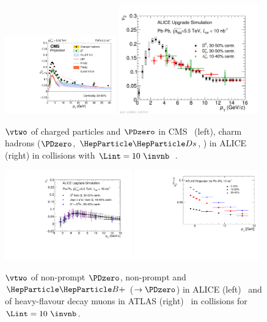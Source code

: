 \begin{figure}[ht]
  \begin{center}
    \includegraphics[width=0.43\textwidth]{hf/figures/cV2_lumiMB_0_wTheory_right.pdf}
   \includegraphics[width=0.54\textwidth]{hf/figures/ALICEUpgrade_charmv2.pdf}
    \caption{$\vtwo$ of charged particles and $\PDzero$ in CMS~\cite{CMS-PAS-FTR-17-002} (left), charm hadrons ($\PDzero$, $\PDs$, \PGLc) in ALICE (right) in \PbPb collisions with $\Lint=10~\invnb$~\cite{Abelev:1625842}.}
    \label{fig:RAAv2.v2charm}
  \end{center}
\end{figure}
\begin{figure}[ht]
  \begin{center}
    \includegraphics[width=0.49\textwidth]{hf/figures/ALICEUpgrade_beautyv2.pdf}
    \includegraphics[width=0.49\textwidth]{hf/figures/hfMuonv2_ATLAS.pdf}
    \caption{$\vtwo$ of non-prompt $\PDzero$, non-prompt \PJGy and $\PBp$ ($\rightarrow \PDzero$) in ALICE (left)~\cite{Abelev:1625842} and of heavy-flavour decay muons in ATLAS (right)~\cite{ATL-PHYS-PUB-2018-020} in \PbPb collisions for $\Lint=10~\invnb$.}
    \label{fig:RAAv2.v2beauty}
  \end{center}
\end{figure}

